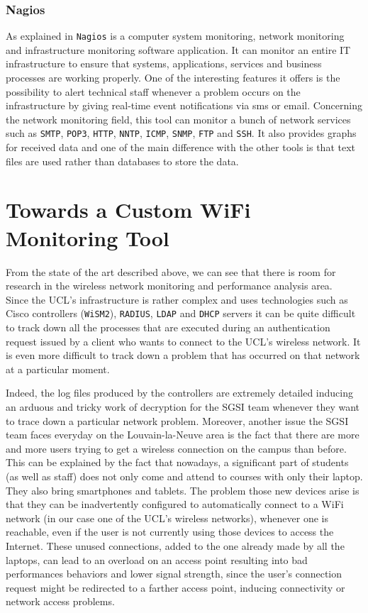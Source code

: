 \subsubsection{Nagios}
As explained in \cite{nagios} \texttt{Nagios} is a computer system monitoring, network monitoring and infrastructure monitoring software application. It can monitor an entire IT infrastructure to ensure that systems, applications, services and business processes are working properly. One of the interesting features it offers is the possibility to alert technical staff whenever a problem occurs on the infrastructure by giving real-time event notifications via sms or email. Concerning the network monitoring field, this tool can monitor a bunch of network services such as \texttt{SMTP}, \texttt{POP3}, \texttt{HTTP}, \texttt{NNTP}, \texttt{ICMP}, \texttt{SNMP}, \texttt{FTP} and \texttt{SSH}. It also provides graphs for received data and one of the main difference with the other tools is that text files are used rather than databases to store the data.


\section{Towards a Custom WiFi Monitoring Tool}
From the state of the art described above, we can see that there is room for research in the wireless network monitoring and performance analysis area.\\
Since the UCL's infrastructure is rather complex and uses technologies such as Cisco controllers (\texttt{WiSM2}), \texttt{RADIUS}, \texttt{LDAP} and \texttt{DHCP} servers it can be quite difficult to track down all the processes that are executed during an authentication request issued by a client who wants to connect to the UCL's wireless network. It is even more difficult to track down a problem that has occurred on that network at a particular moment.

Indeed, the log files produced by the controllers are extremely detailed inducing an arduous and tricky work of decryption for the SGSI team whenever they want to trace down a particular network problem. Moreover, another issue the SGSI team faces everyday on the Louvain-la-Neuve area is the fact that there are more and more users trying to get a wireless connection on the campus than before. This can be explained by the fact that nowadays, a significant part of students (as well as staff) does not only come and attend to courses with only their laptop. They also bring smartphones and tablets. The problem those new devices arise is that they can be inadvertently configured to automatically connect to a WiFi network (in our case one of the UCL's wireless networks), whenever one is reachable, even if the user is not currently using those devices to access the Internet. These unused connections, added to the one already made by all the laptops, can lead to an overload on an access point resulting into bad performances behaviors and lower signal strength, since the user's connection request might be redirected to a farther access point, inducing connectivity or network access problems.

